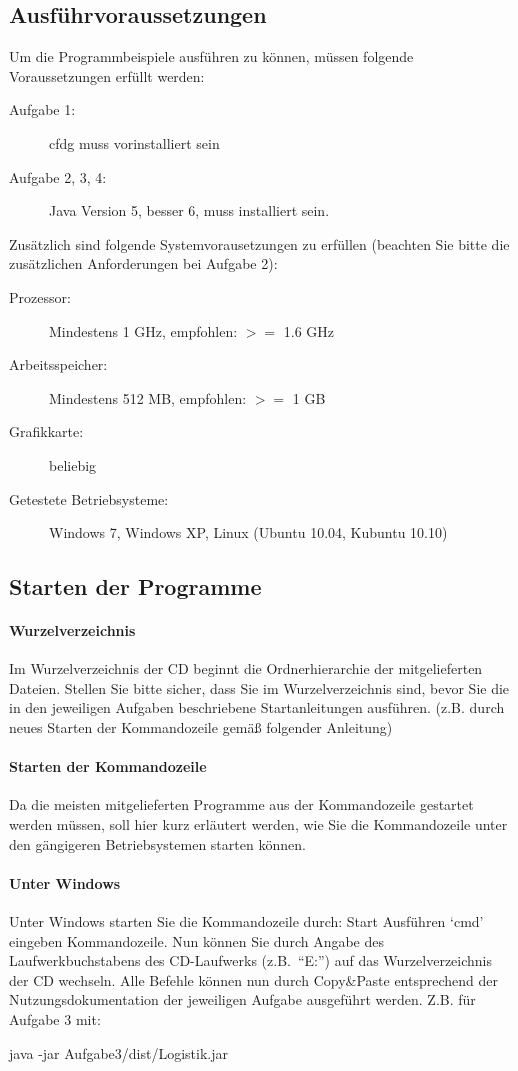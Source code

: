 \documentclass[a4paper,11pt]{scrartcl}
\begin{document}
\subsection{Ausführvoraussetzungen}
\label{Vor}
Um die Programmbeispiele ausführen zu können, müssen folgende Voraussetzungen erfüllt werden:
\begin{description}
 \item[Aufgabe 1:] cfdg muss vorinstalliert sein
 \item[Aufgabe 2, 3, 4:] Java Version 5, besser 6, muss installiert sein.
\end{description}
Zusätzlich sind folgende Systemvorausetzungen zu erfüllen (beachten Sie bitte die zusätzlichen Anforderungen bei Aufgabe 2):
\begin{description}
 \item[Prozessor:] Mindestens 1 GHz, empfohlen: $>=$ 1.6 GHz
 \item[Arbeitsspeicher:] Mindestens 512 MB, empfohlen: $>=$ 1 GB
 \item[Grafikkarte:] beliebig
 \item[Getestete Betriebsysteme:] Windows 7, Windows XP, Linux (Ubuntu 10.04, Kubuntu 10.10)
\end{description}
\subsection{Starten der Programme}
\paragraph{Wurzelverzeichnis} Im Wurzelverzeichnis der CD beginnt die Ordnerhierarchie der mitgelieferten Dateien.
Stellen Sie bitte sicher, dass Sie im Wurzelverzeichnis sind, bevor Sie die in den jeweiligen Aufgaben beschriebene Startanleitungen ausführen.
(z.B. durch neues Starten der Kommandozeile gemäß folgender Anleitung)
\paragraph{Starten der Kommandozeile}
Da die meisten mitgelieferten Programme aus der Kommandozeile gestartet werden müssen, soll hier kurz erläutert werden,
wie Sie die Kommandozeile unter den gängigeren Betriebsystemen starten können.
\newcommand{\then}{\textrightarrow{} }
\paragraph{Unter Windows}
Unter Windows starten Sie die Kommandozeile durch: Start \then Ausführen \then `cmd' eingeben \then Kommandozeile.
Nun können Sie durch Angabe des Laufwerkbuchstabens des CD-Laufwerks (z.B.\ ``E:'') auf das Wurzelverzeichnis der CD wechseln.
Alle Befehle können nun durch Copy\&Paste entsprechend der Nutzungsdokumentation der jeweiligen Aufgabe ausgeführt werden. Z.B. für Aufgabe 3 mit:
\begin{center} java -jar Aufgabe3/dist/Logistik.jar \end{center}
\end{document}

